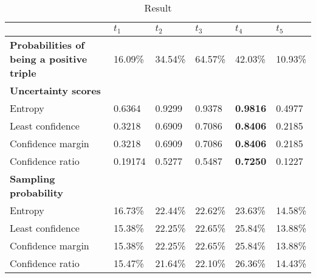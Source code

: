 \begin{table}[h]
    \centering
    \begin{tabular}{llllll}
        \toprule
        
        &  \textbf{$t_1$} & \textbf{$t_2$} & \textbf{$t_3$} & \textbf{$t_4$} & \textbf{$t_5$} \\
         
        \midrule
        
        \textbf{Probabilities of being a positive triple}
        & 16.09\% 
        & 34.54\% 
        & 64.57\% 
        & 42.03\% 
        & 10.93\%  \\
        
        \midrule
        \textbf{Uncertainty scores}
        & & & & & \\
        
        Entropy 
        & 0.6364 & 0.9299 & 0.9378 & \textbf{0.9816} & 0.4977 \\
        
        Least confidence 
        & 0.3218 & 0.6909 & 0.7086 & \textbf{0.8406} & 0.2185 \\
        
        Confidence margin
        & 0.3218 & 0.6909 & 0.7086 & \textbf{0.8406} & 0.2185 \\
        
        Confidence ratio
        & 0.19174 & 0.5277 & 0.5487 & \textbf{0.7250} & 0.1227\\
        
        \midrule
        \textbf{Sampling probability}
        & & & & & \\
        
        Entropy 
        & 16.73\% & 22.44\% & 22.62\% & 23.63\% & 14.58\% \\
        
        Least confidence 
        & 15.38\% & 22.25\% & 22.65\% & 25.84\% & 13.88\% \\
       
        Confidence margin
        & 15.38\% & 22.25\% & 22.65\% & 25.84\% & 13.88\% \\
        
        Confidence ratio
        & 15.47\% & 21.64\% & 22.10\% & 26.36\% & 14.43\% \\
        
        \bottomrule
    \end{tabular}
    \caption{Result}
\label{tab:uncertainty_metrics_example_distribution}
\end{table}